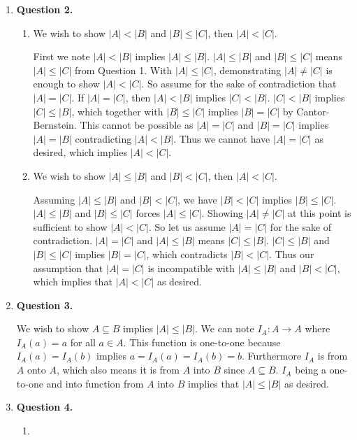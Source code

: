 \documentclass{article}
\begin{document}
\begin{enumerate}
		\item \textbf{Question 2.}	
		\begin{enumerate}
			\item We wish to show $|A| < |B|$ and $|B| \leq |C|$, then $|A| < |C|$. 
			\medskip
			
			First we note $|A| < |B|$ implies $|A| \leq |B|$. $|A| \leq |B|$ and $|B| \leq |C|$ means $|A| \leq |C|$ from Question 1. With $|A| \leq |C|$, demonstrating $|A| \neq |C|$ is enough to show $|A| < |C|$. So assume for the sake of contradiction that $|A| = |C|$. If $|A| = |C|$, then $|A| < |B|$ implies $|C| < |B|$. $|C| < |B|$ implies $|C| \leq |B|$, which together with $|B| \leq |C|$ implies $|B| = |C|$ by Cantor-Bernstein. This cannot be possible as $|A| = |C|$ and $|B| = |C|$ implies $|A| = |B|$ contradicting $|A| < |B|$. Thus we cannot have $|A| = |C|$ as desired, which implies $|A| < |C|$.
			
			\item We wish to show $|A| \leq |B|$ and $|B| < |C|$, then $|A| < |C|$.
			\medskip
			
			Assuming $|A| \leq |B|$ and $|B| < |C|$, we have $|B| < |C|$ implies $|B| \leq |C|$. $|A| \leq |B|$ and $|B| \leq |C|$ forces $|A| \leq |C|$. Showing $|A| \neq |C|$ at this point is sufficient to show $|A| < |C|$. So let us assume $|A| = |C|$ for the sake of contradiction. $|A| = |C|$ and $|A| \leq |B|$ means $|C| \leq |B|$. $|C| \leq |B|$ and $|B| \leq |C|$ implies $|B| = |C|$, which contradicts $|B| < |C|$. Thus our assumption that $|A| = |C|$ is incompatible with $|A| \leq |B|$ and $|B| < |C|$, which implies that $|A| < |C|$ as desired.
		
		\end{enumerate}
		
		\item \textbf{Question 3.}
		\medskip
		
		We wish to show $A \subseteq B$ implies $|A| \leq |B|$. We can note $I_{A}: A \xrightarrow{} A$ where $I_{A}(a) = a$ for all $a \in A$. This function is one-to-one because $I_{A}(a) = I_{A}(b)$ implies $a = I_{A}(a) = I_{A}(b) = b$. Furthermore $I_{A}$ is from $A$ onto $A$, which also means it is from $A$ into $B$ since $A \subseteq B$. $I_{A}$ being a one-to-one and into function from $A$ into $B$ implies that $|A| \leq |B|$ as desired.
		
		\item \textbf{Question 4.}
		\begin{enumerate}
			\item 
			\medskip
			

\end{enumerate}
\end{enumerate}
\end{document}
